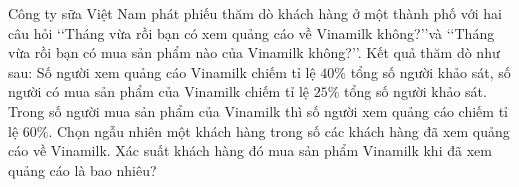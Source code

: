 \begin{bt}%
	Công ty sữa Việt Nam phát phiếu thăm dò khách hàng ở một thành phố với hai câu hỏi \lq\lq Tháng vừa rồi bạn có xem quảng cáo về Vinamilk không?\rq\rq và \lq\lq Tháng vừa rồi bạn có mua sản phẩm nào của Vinamilk không?\rq\rq. Kết quả thăm dò như sau: Số người xem quảng cáo Vinamilk chiếm tỉ lệ $40\%$ tổng số người khảo sát, số người có mua sản  phẩm của Vinamilk chiếm tỉ lệ $25\%$ tổng số người khảo sát. Trong số người mua sản phẩm của Vinamilk thì số người xem quảng cáo chiếm tỉ lệ $60\%$. Chọn ngẫu nhiên một khách hàng trong số các khách hàng đã xem quảng cáo về Vinamilk. Xác suất khách hàng đó mua sản phẩm Vinamilk khi đã xem quảng cáo là bao nhiêu?
\end{bt}

